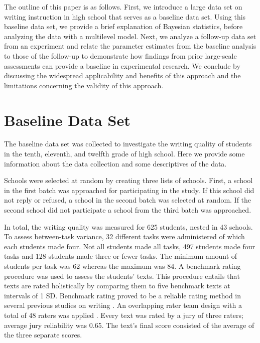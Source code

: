 \documentclass[man, mask]{apa7}
\begin{document}
The outline of this paper is as follows. 
First, we introduce a large data set on writing instruction in high school that serves as a baseline data set. 
Using this baseline data set, we provide a brief explanation of Bayesian statistics, before analyzing the data with a multilevel model. 
Next, we analyze a follow-up data set from an experiment and relate the parameter estimates from the baseline analysis to those of the follow-up to demonstrate how findings from prior large-scale assessments can provide a baseline in experimental research. 
We conclude by discussing the widespread applicability and benefits of this approach and the limitations concerning the validity of this approach.


\section{Baseline Data Set}
\noindent The baseline data set was collected to investigate the writing quality of students in the tenth, eleventh, and twelfth grade of high school. Here we provide some information about the data collection and some descriptives of the data.

Schools were selected at random by creating three lists of schools. First, a school in the first batch was approached for participating in the study. If this school did not reply or refused, a school in the second batch was selected at random. If the second school did not participate a school from the third batch was approached.

In total, the writing quality was measured for 625 students, nested in 43 schools. To assess between-task variance, 32 different tasks were administered of which each students made four. Not all students made all tasks, 497 students made four tasks and 128 students made three or fewer tasks. The minimum amount of students per task was 62 whereas the maximum was 84. 
A benchmark rating procedure was used to assess the students' texts.
This procedure entails that texts are rated holistically by comparing them to five benchmark texts at intervals of 1 SD.
Benchmark rating proved to be a reliable rating method in several previous studies on writing \parencite{blok1986essay, de2016student, rietdijk2017improving,bouwer2017tekster}.
An overlapping rater team design with a total of 48 raters was applied \parencite{vandenbergh1989method}.
Every text was rated by a jury of three raters; average jury reliability was 0.65. The text's final score consisted of the average of the three separate scores.
\end{document}

